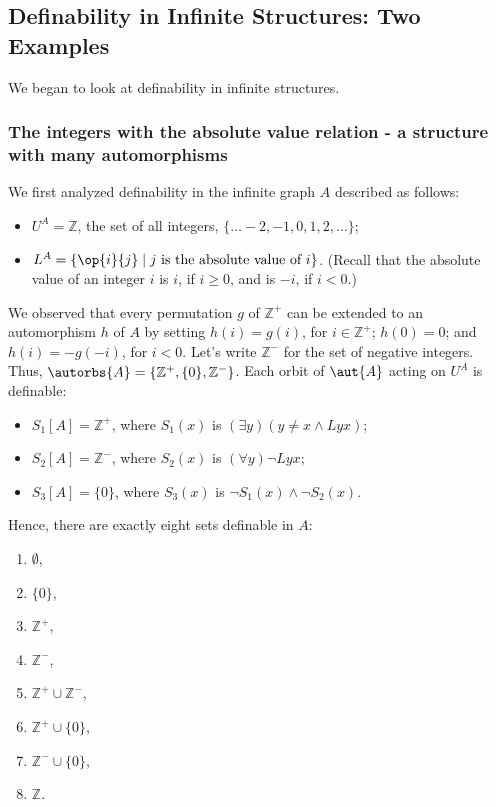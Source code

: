 \subsection{Definability in Infinite Structures: Two Examples}

We began to look at definability in infinite structures. 
\subsubsection{The integers with the absolute value relation - a structure with many automorphisms}
We first analyzed definability in the infinite graph $A$ described as follows:
\begin{itemize}
\item
$U^A = \mathbb{Z}$, the set of all integers, $\{\ldots -2,-1,0,1,2,\ldots\}$; 
\item
$L^A=\{\op{i}{j}\mid j \mbox{ is the absolute value of } i\}$. (Recall that the absolute value of an integer $i$ is $i$, if $i\geq 0$, and is $-i$, if $i< 0$.) 
\end{itemize}
We observed that every permutation $g$ of $\mathbb{Z}^+$ can be extended to an automorphism $h$ of $A$ by setting $h(i)=g(i)$, for $i\in \mathbb{Z}^+$; $h(0)=0$; and $h(i)=-g(-i)$, for $i<0$. Let's write $\mathbb{Z}^-$ for the set of negative integers. Thus, $\autorbs{A}= \{\mathbb{Z}^+,\{0\},\mathbb{Z}^-\}$. Each orbit of $\aut{A}$ acting on $U^A$ is definable:
\begin{itemize}
\item 
$S_1[A] = \mathbb{Z}^+$, where $S_1(x)$ is $(\exists y)(y\neq x \wedge Lyx)$;
\item 
$S_2[A] = \mathbb{Z}^-$, where $S_2(x)$ is $(\forall y)\neg Lyx$;
\item 
$S_3[A] = \{0\}$, where $S_3(x)$ is $\neg S_1(x)\wedge\neg S_2(x)$.
\end{itemize} 
Hence, there are exactly eight sets definable in $A$:
\begin{enumerate}
\item $\emptyset$,
\item $\{0\}$,
\item $\mathbb{Z}^+$,
\item $\mathbb{Z}^-$,
\item $\mathbb{Z}^+\cup\mathbb{Z}^-$,
\item $\mathbb{Z}^+\cup\{0\}$,
\item $\mathbb{Z}^-\cup\{0\}$,
\item $\mathbb{Z}$.
\end{enumerate}
